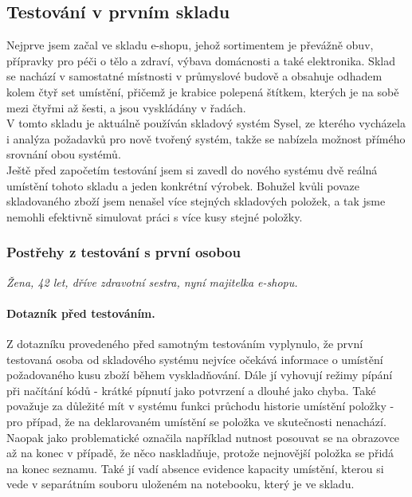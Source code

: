 \subsection{Testování v prvním skladu}

Nejprve jsem začal ve skladu e-shopu, jehož sortimentem je převážně obuv, přípravky pro péči o tělo a zdraví, výbava domácnosti a také elektronika. Sklad se nachází v samostatné místnosti v průmyslové budově a obsahuje odhadem kolem čtyř set umístění, přičemž  je krabice polepená štítkem, kterých je na sobě mezi čtyřmi až šesti, a jsou vyskládány v řadách.\\
V tomto skladu je aktuálně používán skladový systém Sysel, ze kterého vycházela i analýza požadavků pro nově tvořený systém, takže se nabízela možnost přímého srovnání obou systémů.\\
Ještě před započetím testování jsem si zavedl do nového systému dvě reálná umístění tohoto skladu a jeden konkrétní výrobek. Bohužel kvůli povaze skladovaného zboží jsem nenašel více stejných skladových položek, a tak jsme nemohli efektivně simulovat práci s více kusy stejné položky.


\subsubsection{Postřehy z testování s první osobou}
\emph{Žena, 42 let, dříve zdravotní sestra, nyní majitelka e-shopu.}

\paragraph{Dotazník před testováním.} Z dotazníku provedeného před samotným testováním vyplynulo, že první testovaná osoba od skladového systému nejvíce očekává informace o umístění požadovaného kusu zboží během vyskladňování. Dále jí vyhovují režimy pípání při načítání kódů - krátké pípnutí jako potvrzení a dlouhé jako chyba. Také považuje za důležité mít v systému funkci průchodu historie umístění položky - pro případ, že na deklarovaném umístění se položka ve skutečnosti nenachází. Naopak jako problematické označila například nutnost posouvat se na obrazovce až na konec v případě, že něco naskladňuje, protože nejnovější položka se přidá na konec seznamu. Také jí vadí absence evidence kapacity umístění, kterou si vede v separátním souboru uloženém na notebooku, který je ve skladu.\\

